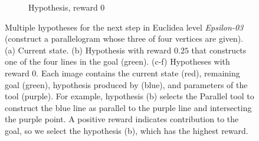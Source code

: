 \begin{figure}[!htb]
\begin{subfigure}[t]{0.32\textwidth}
         \caption{Hypothesis, reward $0$}
         \label{fig:hypotheses_explorer_hypothesis5}
     \end{subfigure}
        \caption{Multiple hypotheses for the next step in Euclidea level \textit{Epsilon-03} (construct a parallelogram whose three of four vertices are given). (a) Current state. (b) Hypothesis with reward $0.25$ that constructs one of the four lines in the goal (green). (c-f) Hypotheses with reward $0$. Each image contains the current state (red), remaining goal (green), hypothesis produced by \maskrcnn (blue), and
        parameters of the tool (purple). For example, hypothesis (b) selects the Parallel tool to construct the blue line as parallel to the purple line and intersecting the purple point. A positive reward indicates contribution to the goal, so we select the hypothesis (b), which has the highest reward.
        }
        \label{fig:hypotheses_explorer}
\end{figure}

